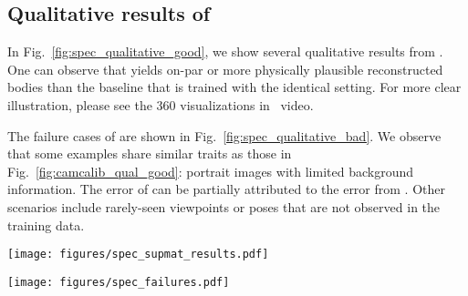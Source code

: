 \documentclass[10pt,twocolumn,letterpaper,usenames,dvipsnames]{article}
\begin{document}
\subsection{Qualitative results of \methodname}
In Fig.~\ref{fig:spec_qualitative_good}, we show several qualitative results from \methodname. 
One can observe that \methodname yields on-par or more physically plausible reconstructed bodies than the baseline that is trained with the identical setting.
For more clear illustration, please see the 360 visualizations in \supmat~video.

The failure cases of \methodname are shown in Fig.~\ref{fig:spec_qualitative_bad}. 
We observe that some examples share similar traits as those in Fig.~\ref{fig:camcalib_qual_good}: portrait images with limited background information. 
The error of \methodname can be partially attributed to the error from \camcalib.
Other scenarios include rarely-seen viewpoints or poses that are not observed in the training data.


\begin{figure*}
    \centering
    \texttt{[image: figures/spec\_supmat\_results.pdf]}
    \caption{\textbf{SPEC qualitative results.}}
    \label{fig:spec_qualitative_good}
\end{figure*}

\begin{figure*}
    \centering
    \texttt{[image: figures/spec\_failures.pdf]}
    \caption{\textbf{SPEC failures.}}
    \label{fig:spec_qualitative_bad}
\end{figure*}
 
\end{document}
